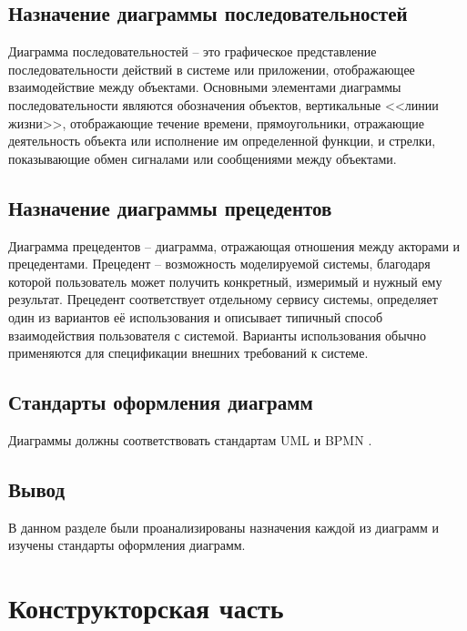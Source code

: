 \documentclass[12pt]{report}
\begin{document}
\section{Назначение диаграммы последовательностей}
Диаграмма последовательностей -- это графическое представление последовательности действий в системе или приложении, отображающее взаимодействие между объектами.
Основными элементами диаграммы последовательности являются обозначения объектов, вертикальные <<линии жизни>>, отображающие течение времени, прямоугольники, отражающие деятельность объекта или исполнение им определенной функции, и стрелки, показывающие обмен сигналами или сообщениями между объектами.

\section{Назначение диаграммы прецедентов}
Диаграмма прецедентов -- диаграмма, отражающая отношения между акторами и прецедентами. 
Прецедент -- возможность моделируемой системы, благодаря которой пользователь может получить конкретный, измеримый и нужный ему результат. 
Прецедент соответствует отдельному сервису системы, определяет один из вариантов её использования и описывает типичный способ взаимодействия пользователя с системой. Варианты использования обычно применяются для спецификации внешних требований к системе.

\section{Стандарты оформления диаграмм}
Диаграммы должны соответствовать стандартам UML \cite{bib:1} и BPMN \cite{bib:2}.

\section*{Вывод}
	В данном разделе были проанализированы назначения каждой из диаграмм и изучены стандарты оформления диаграмм.
\clearpage

\chapter{Конструкторская часть}
\end{document}
